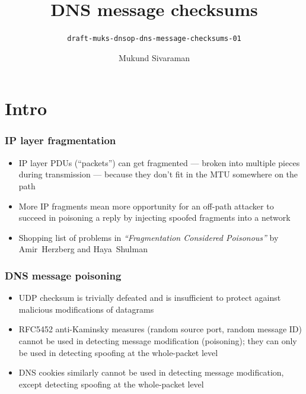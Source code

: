 \documentclass{beamer}
\title{DNS message checksums}
\subtitle{\texttt{draft-muks-dnsop-dns-message-checksums-01}}
\author{Mukund Sivaraman}
\institute{Internet Systems Consortium}
\date{}
\begin{document}
\frame{\titlepage}

\section{Intro}
\frame
{
  \frametitle{IP layer fragmentation}

  \begin{itemize}
  \item IP layer PDUs (``packets'') can get fragmented --- broken into
    multiple pieces during transmission --- because they don't fit in
    the MTU somewhere on the path
  \item More IP fragments mean more opportunity for an off-path attacker
    to succeed in poisoning a reply by injecting spoofed fragments into
    a network
  \item Shopping list of problems in \textsl{``Fragmentation Considered
    Poisonous''} by Amir~Herzberg and Haya~Shulman


  \end{itemize}
}

\frame
{
  \frametitle{DNS message poisoning}

  \begin{itemize}
  \item UDP checksum is trivially defeated and is insufficient to
    protect against malicious modifications of datagrams
  \item RFC5452 anti-Kaminsky measures (random source port, random
    message ID) cannot be used in detecting message modification
    (poisoning); they can only be used in detecting spoofing at the
    whole-packet level
  \item DNS cookies similarly cannot be used in detecting message
    modification, except detecting spoofing at the whole-packet level
  \end{itemize}
}
\end{document}
